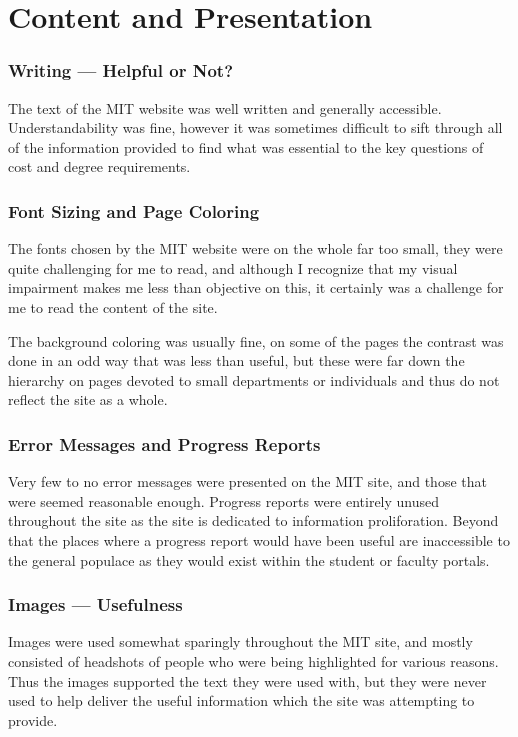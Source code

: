 \section*{Content and Presentation}

\subsubsection*{Writing --- Helpful or Not?}

The text of the MIT website was well written and generally accessible. Understandability was
fine, however it was sometimes difficult to sift through all of the information provided to
find what was essential to the key questions of cost and degree requirements.

\subsubsection*{Font Sizing and Page Coloring}

The fonts chosen by the MIT website were on the whole far too small, they were quite
challenging for me to read, and although I recognize that my visual impairment makes me less
than objective on this, it certainly was a challenge for me to read the content of the site.

The background coloring was usually fine, on some of the pages the contrast was done in an
odd way that was less than useful, but these were far down the hierarchy on pages devoted to
small departments or individuals and thus do not reflect the site as a whole.

\subsubsection*{Error Messages and Progress Reports}

Very few to no error messages were presented on the MIT site, and those that were seemed reasonable enough.
Progress reports were entirely unused throughout the site as the site is dedicated to
information proliforation. Beyond that the places where a progress report would have been
useful are inaccessible to the general populace as they would exist within the student or
faculty portals.

\subsubsection*{Images --- Usefulness}

Images were used somewhat sparingly throughout the MIT site, and mostly consisted of headshots of people who were
being highlighted for various reasons. Thus the images supported the text they were used
with, but they were never used to help deliver the useful information which the site
was attempting to provide.

